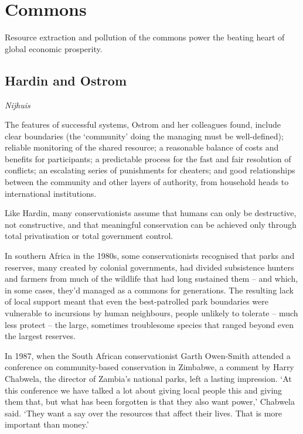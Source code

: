 \documentclass[
]{book}
\begin{document}
\hypertarget{commons}{%
\section{Commons}\label{commons}}

Resource extraction and pollution of the commons
power the beating heart of global economic prosperity.

\hypertarget{hardin-and-ostrom}{%
\subsection{Hardin and Ostrom}\label{hardin-and-ostrom}}

\emph{Nijhuis}

The features of successful systems, Ostrom and her colleagues found, include clear boundaries (the `community' doing the managing must be well-defined); reliable monitoring of the shared resource; a reasonable balance of costs and benefits for participants; a predictable process for the fast and fair resolution of conflicts; an escalating series of punishments for cheaters; and good relationships between the community and other layers of authority, from household heads to international institutions.

Like Hardin, many conservationists assume that humans can only be destructive, not constructive, and that meaningful conservation can be achieved only through total privatisation or total government control.

In southern Africa in the 1980s, some conservationists recognised that parks and reserves, many created by colonial governments, had divided subsistence hunters and farmers from much of the wildlife that had long sustained them -- and which, in some cases, they'd managed as a commons for generations. The resulting lack of local support meant that even the best-patrolled park boundaries were vulnerable to incursions by human neighbours, people unlikely to tolerate -- much less protect -- the large, sometimes troublesome species that ranged beyond even the largest reserves.

In 1987, when the South African conservationist Garth Owen-Smith attended a conference on community-based conservation in Zimbabwe, a comment by Harry Chabwela, the director of Zambia's national parks, left a lasting impression. `At this conference we have talked a lot about giving local people this and giving them that, but what has been forgotten is that they also want power,' Chabwela said. `They want a say over the resources that affect their lives. That is more important than money.'
\end{document}
